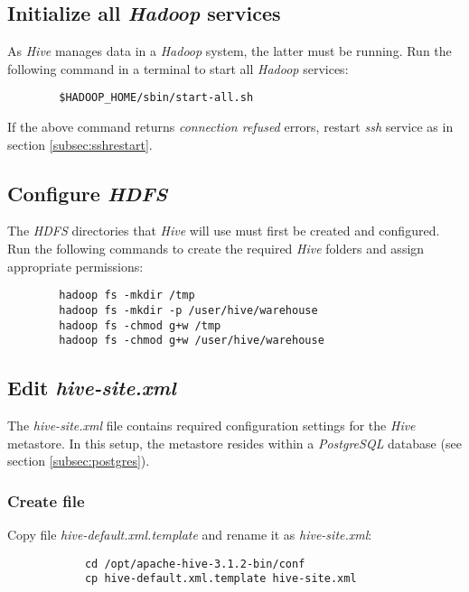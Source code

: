\documentclass{article}
\begin{document}
    \subsection{Initialize all \emph{Hadoop} services}
    \label{subsec:hadoopall}
    As \emph{Hive} manages data in a \emph{Hadoop} system, the latter must be running.
    Run the following command in a terminal to start all \emph{Hadoop} services:
    \begin{verbatim}
        $HADOOP_HOME/sbin/start-all.sh
    \end{verbatim}
    If the above command returns \emph{connection refused} errors, restart \emph{ssh} service as
    in section \ref{subsec:sshrestart}.

    \subsection{Configure \emph{HDFS}}
    The \emph{HDFS} directories that \emph{Hive} will use must first be created and configured.
    Run the following commands to create the required \emph{Hive} folders and assign appropriate
    permissions:

    \begin{verbatim}
        hadoop fs -mkdir /tmp 
        hadoop fs -mkdir -p /user/hive/warehouse 
        hadoop fs -chmod g+w /tmp 
        hadoop fs -chmod g+w /user/hive/warehouse
    \end{verbatim}

    \subsection{Edit \emph{hive-site.xml}}
    The \emph{hive-site.xml} file contains required configuration settings for the \emph{Hive} metastore.
    In this setup, the metastore resides within a \emph{PostgreSQL} database (see section \ref{subsec:postgres}).

        \subsubsection{Create file}
        Copy file \emph{hive-default.xml.template} and rename it as \emph{hive-site.xml}:
        \begin{verbatim}
            cd /opt/apache-hive-3.1.2-bin/conf
            cp hive-default.xml.template hive-site.xml
        \end{verbatim}
\end{document}
